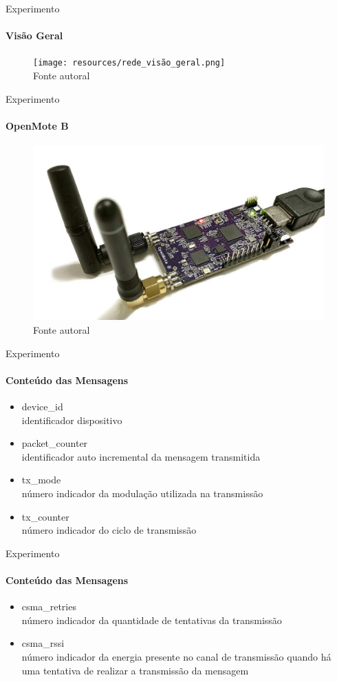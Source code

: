 \documentclass[c]{beamer}
\begin{document}
\begin{darkframes}
  \begin{frame}{Experimento}
    \framesubtitle{Visão Geral}
    \begin{figure}
      \centering
      \texttt{[image: resources/rede\_visão\_geral.png]}\\
      \footnotesize{Fonte autoral}
    \end{figure}
  \end{frame}

  \begin{frame}{Experimento}
    \framesubtitle{OpenMote B}
    \begin{figure}
      \centering
      \includegraphics[width=.8\textwidth]{resources/openmote-b.jpg}\\
      \footnotesize{Fonte autoral}
    \end{figure}
  \end{frame}

  \begin{frame}{Experimento}
    \framesubtitle{Conteúdo das Mensagens}
    \begin{itemize}
      \item \alert{device\_id} \\ identificador dispositivo
      \item \alert{packet\_counter} \\ identificador auto incremental da mensagem transmitida
      \item \alert{tx\_mode} \\ número indicador da modulação utilizada na transmissão
      \item \alert{tx\_counter} \\ número indicador do ciclo de transmissão
    \end{itemize}
  \end{frame}
  \begin{frame}{Experimento}
    \framesubtitle{Conteúdo das Mensagens}
    \begin{itemize}
      \item \alert{csma\_retries} \\ número indicador da quantidade de tentativas da transmissão
      \item \alert{csma\_rssi} \\ número indicador da energia presente no canal de transmissão quando há uma tentativa de realizar a transmissão da mensagem
    \end{itemize}
  \end{frame}


\end{darkframes}
\end{document}
